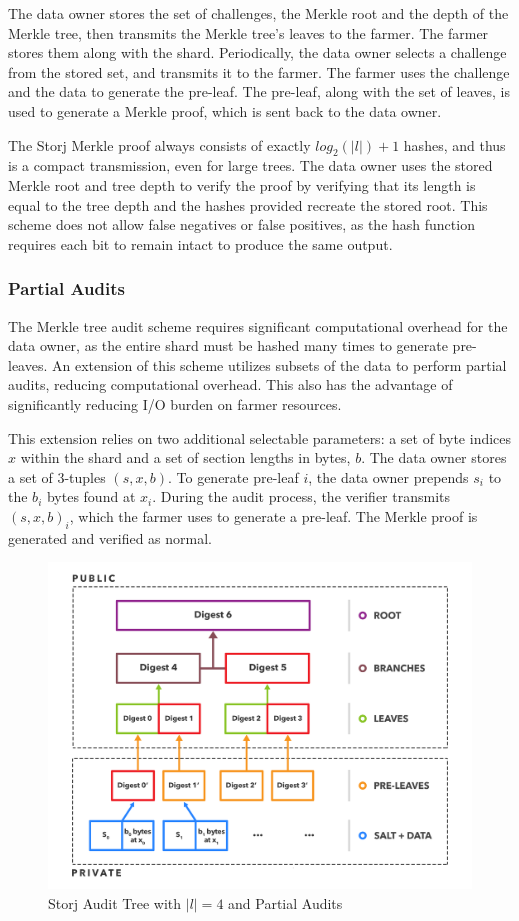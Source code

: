 \documentclass[a4paper,10pt]{article}
\begin{document}
The data owner stores the set of challenges, the Merkle root and the depth of the Merkle tree, then transmits the Merkle tree’s leaves to the farmer. The farmer stores them along with the shard. Periodically, the data owner selects a challenge from the stored set, and transmits it to the farmer. The farmer uses the challenge and the data to generate the pre-leaf. The pre-leaf, along with the set of leaves, is used to generate a Merkle proof, which is sent back to the data owner.

The Storj Merkle proof always consists of exactly $ log_{2}(|l|)+1 $ hashes, and thus is a compact transmission, even for large trees. The data owner uses the stored Merkle root and tree depth to verify the proof by verifying that its length is equal to the tree depth and the hashes provided recreate the stored root. This scheme does not allow false negatives or false positives, as the hash function requires each bit to remain intact to produce the same output.

\subsubsection{Partial Audits}
The Merkle tree audit scheme requires significant computational overhead for the data owner, as the entire shard must be hashed many times to generate pre-leaves. An extension of this scheme utilizes subsets of the data to perform partial audits, reducing computational overhead. This also has the advantage of significantly reducing I/O burden on farmer resources.

This extension relies on two additional selectable parameters: a set of byte indices $ x $ within the shard and a set of section lengths in bytes, $ b $. The data owner stores a set of 3-tuples $ (s, x, b) $. To generate pre-leaf $ i $, the data owner prepends $ s_{i} $ to the $ b_{i} $ bytes found at $ x_{i} $. During the audit process, the verifier transmits $ (s, x, b)_{i} $, which the farmer uses to generate a pre-leaf. The Merkle proof is generated and verified as normal.

\begin{figure}[hbt]
\centering
\includegraphics[width=\linewidth]{3}
\caption{Storj Audit Tree with $ |l| = 4 $ and Partial Audits}
\end{figure}
\end{document}
